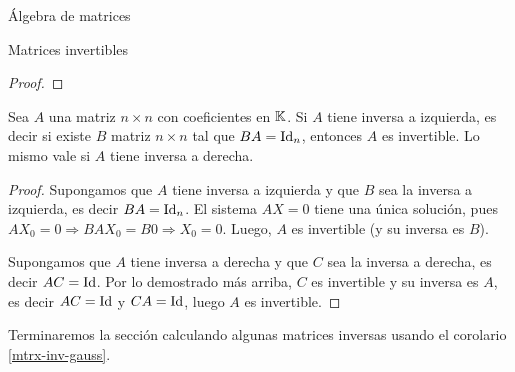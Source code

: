 \begin{chapter}{\'Algebra de matrices}
\begin{section}{Matrices invertibles}
\begin{proof}
            \end{proof}
            
            \begin{corolario}
                Sea $A$ una matriz $n \times n$ con coeficientes  en $\mathbb K$. Si $A$ tiene inversa a izquierda,  es decir si existe $B$ matriz $n \times n$ tal que $BA=\operatorname{Id}_n$,   entonces $A$ es invertible.  Lo mismo vale si $A$ tiene inversa a derecha. 
            \end{corolario}    
            \begin{proof}
                Supongamos que  $A$ tiene inversa a izquierda y  que $B$ sea la inversa a izquierda,  es decir $BA=\operatorname{Id}_n$. El sistema $AX=0$ tiene una única solución, pues $AX_0=0 \Rightarrow BAX_0=B0 \Rightarrow X_0=0$. Luego, $A$  es invertible (y su inversa es $B$). 
                
                Supongamos que  $A$ tiene inversa a derecha y  que $C$ sea la inversa a derecha, es decir $AC=\operatorname{Id}$. Por lo demostrado más arriba, $C$ es invertible y su inversa es $A$, es decir $AC=\operatorname{Id}$ y $CA=\operatorname{Id}$, luego $A$  es invertible. 
            \end{proof}    
            
            
            
            Terminaremos la  sección calculando algunas matrices inversas usando el corolario  \ref{mtrx-inv-gauss}. 
            

\end{section}
\end{chapter}
